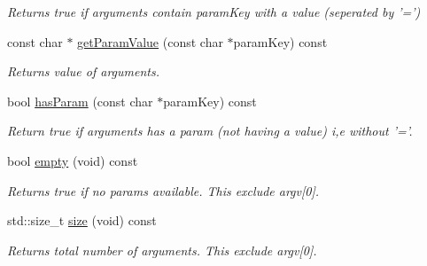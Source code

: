 \begin{DoxyCompactItemize}
\begin{DoxyCompactList}\small\item\em Returns true if arguments contain param\-Key with a value (seperated by '=') \end{DoxyCompactList}\item 
const char $\ast$ \hyperlink{classel_1_1base_1_1utils_1_1CommandLineArgs_ad1abe08dfdbdd95c72474197ba4a3cbd}{get\-Param\-Value} (const char $\ast$param\-Key) const 
\begin{DoxyCompactList}\small\item\em Returns value of arguments. \end{DoxyCompactList}\item 
\hypertarget{classel_1_1base_1_1utils_1_1CommandLineArgs_a83fbd7e5d8422e98a7d58d65283f144f}{bool \hyperlink{classel_1_1base_1_1utils_1_1CommandLineArgs_a83fbd7e5d8422e98a7d58d65283f144f}{has\-Param} (const char $\ast$param\-Key) const }\label{classel_1_1base_1_1utils_1_1CommandLineArgs_a83fbd7e5d8422e98a7d58d65283f144f}

\begin{DoxyCompactList}\small\item\em Return true if arguments has a param (not having a value) i,e without '='. \end{DoxyCompactList}\item 
\hypertarget{classel_1_1base_1_1utils_1_1CommandLineArgs_a014c586d14eb73f2ec1deb5b08bdd6a7}{bool \hyperlink{classel_1_1base_1_1utils_1_1CommandLineArgs_a014c586d14eb73f2ec1deb5b08bdd6a7}{empty} (void) const }\label{classel_1_1base_1_1utils_1_1CommandLineArgs_a014c586d14eb73f2ec1deb5b08bdd6a7}

\begin{DoxyCompactList}\small\item\em Returns true if no params available. This exclude argv\mbox{[}0\mbox{]}. \end{DoxyCompactList}\item 
\hypertarget{classel_1_1base_1_1utils_1_1CommandLineArgs_ab335b66a2ca2dea6c9c7b8d54760e975}{std\-::size\-\_\-t \hyperlink{classel_1_1base_1_1utils_1_1CommandLineArgs_ab335b66a2ca2dea6c9c7b8d54760e975}{size} (void) const }\label{classel_1_1base_1_1utils_1_1CommandLineArgs_ab335b66a2ca2dea6c9c7b8d54760e975}

\begin{DoxyCompactList}\small\item\em Returns total number of arguments. This exclude argv\mbox{[}0\mbox{]}. \end{DoxyCompactList}\end{DoxyCompactItemize}
